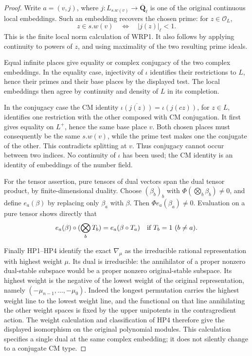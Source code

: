 \documentclass[11pt,a4paper]{article}
\numberwithin{equation}{section}
\theoremstyle{remark}\newtheorem{remark}[theorem]{Remark}
\begin{document}
\begin{proof}
Write \(a=(v,j)\), where \(j:L_{s.w(v)}\to
\overline{\mathbf Q}_\ell\) is one of the original continuous
local embeddings.  Such an embedding recovers the chosen prime:
for \(z\in\mathcal O_L\),
\[
                z\in s.w(v)
                   \quad\Longleftrightarrow\quad |j(z)|_\ell<1.
\]
This is the finite local norm calculation of WRP1.  It also follows
by applying continuity to powers of \(z\), and using maximality
of the two resulting prime ideals.

Equal infinite places give equality or complex conjugacy of the
two complex embeddings.  In the equality case, injectivity of
\(\iota\) identifies their restrictions to \(L\), hence their
primes and their base places by the displayed test.  The local
embeddings then agree by continuity and density of \(L\) in its
completion.

In the conjugacy case the CM identity
\(\overline{\iota(j(z))}=\iota(j(cz))\), for \(z\in L\),
identifies one restriction with the other composed with CM
conjugation.  It first gives equality on \(L^+\), hence the same
base place \(v\).  Both chosen places must consequently be the
same \(s.w(v)\), while the prime test makes one the conjugate of
the other.  This contradicts splitting at \(v\).  Thus conjugacy
cannot occur between two indices.  No continuity of \(\iota\)
has been used; the CM identity is an identity of embeddings of
the number field.

For the tensor assertion, pure tensors of dual vectors span the
dual tensor product, by finite-dimensional duality.  Choose
\((\beta_b)_b\) with
\(\Phi(\bigotimes_b\beta_b)\ne0\), and define \(e_a(\beta)\)
by replacing only \(\beta_a\) with \(\beta\).
Then \(\Phi e_a(\beta_a)\ne0\).  Evaluation on a pure tensor
shows directly that
\[
 e_a(\beta)\circ(\bigotimes_b T_b)
          =e_a(\beta\circ T_a)
                       \quad\hbox{if }T_b=1\ (b\ne a).
\]

Finally HP1--HP4 identify the exact \(\nabla_\mu\) as the
irreducible rational representation with highest weight \(\mu\).
Its dual is irreducible: the annihilator of a proper nonzero
dual-stable subspace would be a proper nonzero original-stable
subspace.  Its highest weight is the negative of the lowest
weight of the original representation, namely
\((-\mu_{n-1},\ldots,-\mu_0)\).
Indeed the longest permutation carries the highest weight line
to the lowest weight line, and the functional on that line
annihilating the other weight spaces is fixed by the upper
unipotents in the contragredient action.  The weight calculation
and classification of HP4 therefore give the displayed
isomorphism on the original polynomial modules.  This calculation
specifies a single dual at the same complex embedding; it does
not silently change to a conjugate CM type.
\end{proof}
\end{document}
